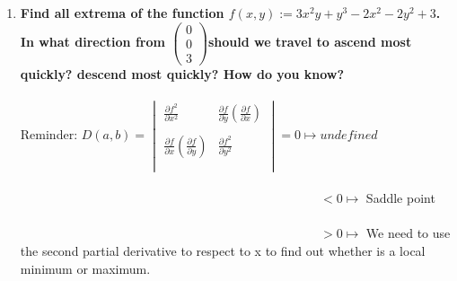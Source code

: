 \documentclass{article}
\begin{document}
\begin{enumerate}[14.]
\item\textbf{Find all extrema of the 
function $f(x,y) := 3x^{2}y+y^{3}-2x^{2}-2y^{2}+3$. In what direction from $\left(\!\begin{array}{c} 0 \\ 0 \\ 3 \end{array} \!\right)$should we travel to ascend most quickly? descend most quickly? How do you know?}\\
\\
Reminder: $D(a,b)= \begin{vmatrix}
\frac{\partial{f^{2}}}{\partial{x^{2}}}&\frac{\partial{f}}{\partial{y}}(\frac{\partial{f}}{\partial{x}})\\\\
\frac{\partial{f}}{\partial{x}}(\frac{\partial{f}}{\partial{y}})&\frac{\partial{f^{2}}}{\partial{y^{2}}}\\\\
\end{vmatrix} = 0 \mapsto  undefined$ \\ 
\\
$\hspace{10cm}< 0\mapsto$ Saddle point\\
\\
$\hspace{10cm}> 0\mapsto$ We need to use the second partial derivative to respect to x to find out whether is a local minimum or maximum. \\
\\


\end{enumerate}
\end{document}
